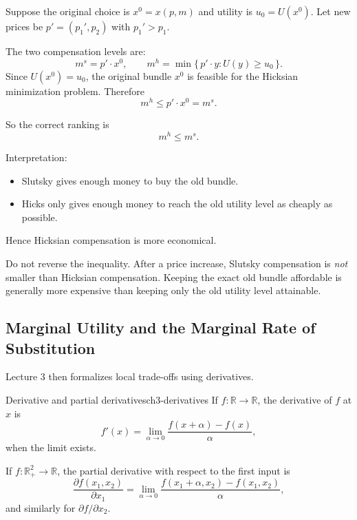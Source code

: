 \begin{examplebox}[title={Worked Example: Slutsky versus Hicksian compensation}]
Suppose the original choice is $x^0=x(p,m)$ and utility is $u_0=U(x^0)$. Let new prices be $p'=(p_1',p_2)$ with $p_1'>p_1$.

The two compensation levels are:
\[
m^s = p' \cdot x^0,
\qquad
m^h = \min\{\,p' \cdot y : U(y)\ge u_0\,\}.
\]
Since $U(x^0)=u_0$, the original bundle $x^0$ is feasible for the Hicksian minimization problem. Therefore
\[
m^h \le p' \cdot x^0 = m^s.
\]

So the correct ranking is
\[
\boxed{m^h \le m^s.}
\]

Interpretation:
\begin{itemize}
    \item Slutsky gives enough money to buy the old bundle.
    \item Hicks only gives enough money to reach the old utility level as cheaply as possible.
\end{itemize}
Hence Hicksian compensation is more economical.
\end{examplebox}

\begin{commonmistake}
Do not reverse the inequality. After a price increase, Slutsky compensation is \emph{not} smaller than Hicksian compensation. Keeping the exact old bundle affordable is generally more expensive than keeping only the old utility level attainable.
\end{commonmistake}

\subsection{Marginal Utility and the Marginal Rate of Substitution}

Lecture 3 then formalizes local trade-offs using derivatives.

\begin{definition}{Derivative and partial derivatives}{ch3-derivatives}
If $f:\mathbb{R}\to\mathbb{R}$, the derivative of $f$ at $x$ is
\[
f'(x)=\lim_{\alpha\to 0}\frac{f(x+\alpha)-f(x)}{\alpha},
\]
when the limit exists.

If $f:\mathbb{R}_+^2\to\mathbb{R}$, the partial derivative with respect to the first input is
\[
\frac{\partial f(x_1,x_2)}{\partial x_1}
=
\lim_{\alpha\to 0}
\frac{f(x_1+\alpha,x_2)-f(x_1,x_2)}{\alpha},
\]
and similarly for $\partial f/\partial x_2$.
\end{definition}

